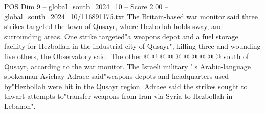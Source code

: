 \begin{textsample}{POS Dim 9 – global\_south\_2024\_10 – Score 2.00 – global\_south\_2024\_10/116891175.txt}
The Britain-based war monitor said three strikes targeted the town of Qusayr, where Hezbollah holds sway, and surrounding areas.
One strike targeted"a weapons depot and a fuel storage facility for Hezbollah in the industrial city of Qusayr", killing three and wounding five others, the Observatory said.
The other @ @ @ @ @ @ @ @ @ @ south of Qusayr, according to the war monitor.
The Israeli military ' s Arabic-language spokesman Avichay Adraee said"weapons depots and headquarters used by"Hezbollah were hit in the Qusayr region.
Adraee said the strikes sought to thwart attempts to"transfer weapons from Iran via Syria to Hezbollah in Lebanon".

\end{textsample}
